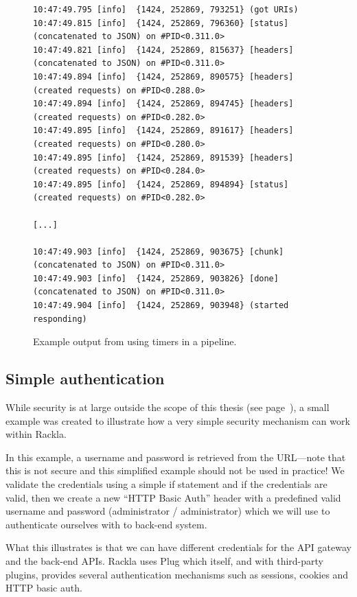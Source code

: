 \documentclass{cslthse-msc}
\begin{document}
\begin{figure}[H]
  \centering
\begin{lstlisting}[breaklines=true,frame=single]
10:47:49.795 [info]  {1424, 252869, 793251} (got URIs)
10:47:49.815 [info]  {1424, 252869, 796360} [status] (concatenated to JSON) on #PID<0.311.0>
10:47:49.821 [info]  {1424, 252869, 815637} [headers] (concatenated to JSON) on #PID<0.311.0>
10:47:49.894 [info]  {1424, 252869, 890575} [headers] (created requests) on #PID<0.288.0>
10:47:49.894 [info]  {1424, 252869, 894745} [headers] (created requests) on #PID<0.282.0>
10:47:49.895 [info]  {1424, 252869, 891617} [headers] (created requests) on #PID<0.280.0>
10:47:49.895 [info]  {1424, 252869, 891539} [headers] (created requests) on #PID<0.284.0>
10:47:49.895 [info]  {1424, 252869, 894894} [status] (created requests) on #PID<0.282.0>

[...]

10:47:49.903 [info]  {1424, 252869, 903675} [chunk] (concatenated to JSON) on #PID<0.311.0>
10:47:49.903 [info]  {1424, 252869, 903826} [done] (concatenated to JSON) on #PID<0.311.0>
10:47:49.904 [info]  {1424, 252869, 903948} (started responding)
\end{lstlisting}
  \caption{Example output from using timers in a pipeline.}
\end{figure}

\subsection{Simple authentication}
While security is at large outside the scope of this thesis (see page~\pageref{sec:security}), a small example was created to illustrate how a very simple security mechanism can work within Rackla.

In this example, a username and password is retrieved from the URL---note that this is not secure and this simplified example should not be used in practice! We validate the credentials using a simple if statement and if the credentials are valid, then we create a new \enquote{HTTP Basic Auth} header with a predefined valid username and password (administrator / administrator) which we will use to authenticate ourselves with to back-end system.

What this illustrates is that we can have different credentials for the API gateway and the back-end APIs. Rackla uses Plug which itself, and with third-party plugins, provides several authentication mechanisms such as sessions, cookies and HTTP basic auth.
\end{document}
